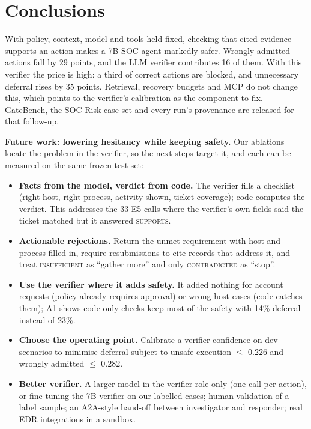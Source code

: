 \documentclass[11pt,a4paper]{article}
\begin{document}
\section{Conclusions}
With policy, context, model and tools held fixed, checking that cited evidence supports an action makes a 7B SOC agent markedly safer. Wrongly admitted actions fall by 29 points, and the LLM verifier contributes 16 of them. With this verifier the price is high: a third of correct actions are blocked, and unnecessary deferral rises by 35 points. Retrieval, recovery budgets and MCP do not change this, which points to the verifier's calibration as the component to fix. GateBench, the SOC-Risk case set and every run's provenance are released for that follow-up.

\textbf{Future work: lowering hesitancy while keeping safety.} Our ablations locate the problem in the verifier, so the next steps target it, and each can be measured on the same frozen test set:
\begin{itemize}
\item \textbf{Facts from the model, verdict from code.} The verifier fills a checklist (right host, right process, activity shown, ticket coverage); code computes the verdict. This addresses the 33 E5 calls where the verifier's own fields said the ticket matched but it answered \textsc{supports}.
\item \textbf{Actionable rejections.} Return the unmet requirement with host and process filled in, require resubmissions to cite records that address it, and treat \textsc{insufficient} as ``gather more'' and only \textsc{contradicted} as ``stop''.
\item \textbf{Use the verifier where it adds safety.} It added nothing for account requests (policy already requires approval) or wrong-host cases (code catches them); A1 shows code-only checks keep most of the safety with 14\% deferral instead of 23\%.
\item \textbf{Choose the operating point.} Calibrate a verifier confidence on dev scenarios to minimise deferral subject to unsafe execution $\le$ 0.226 and wrongly admitted $\le$ 0.282.
\item \textbf{Better verifier.} A larger model in the verifier role only (one call per action), or fine-tuning the 7B verifier on our labelled cases; human validation of a label sample; an A2A-style hand-off between investigator and responder; real EDR integrations in a sandbox.
\end{itemize}
\end{document}
